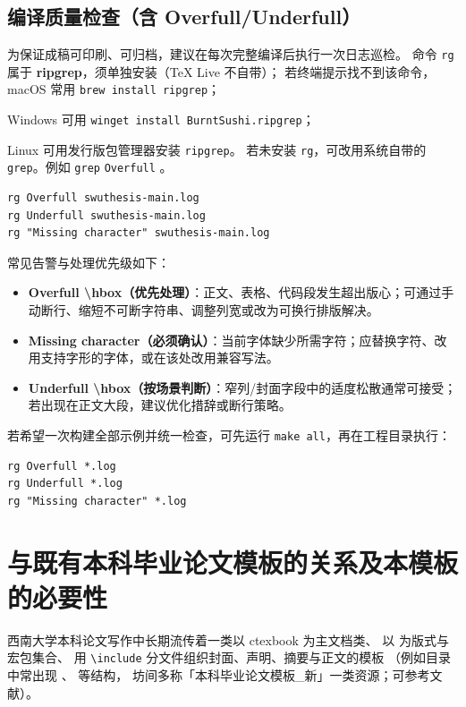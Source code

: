 \subsection{编译质量检查（含 Overfull/Underfull）}\label{sec:compile-quality-check}
为保证成稿可印刷、可归档，建议在每次完整编译后执行一次日志巡检。
命令 \texttt{rg} 属于 \textbf{ripgrep}，须单独安装（\TeX{} Live 不自带）；%
若终端提示找不到该命令，macOS 常用 \texttt{brew install ripgrep}；\par
\noindent
Windows 可用 \texttt{winget install BurntSushi.ripgrep}；\par
\noindent
Linux 可用发行版包管理器安装 \texttt{ripgrep}。%
若未安装 \texttt{rg}，可改用系统自带的 \texttt{grep}。例如%
\texttt{grep} \texttt{Overfull} 。
\begin{verbatim}
rg Overfull swuthesis-main.log
rg Underfull swuthesis-main.log
rg "Missing character" swuthesis-main.log
\end{verbatim}
常见告警与处理优先级如下：
\begin{itemize}[leftmargin=2em]
  \item \textbf{Overfull \textbackslash hbox（优先处理）}：正文、表格、代码段发生超出版心；可通过手动断行、缩短不可断字符串、调整列宽或改为可换行排版解决。
  \item \textbf{Missing character（必须确认）}：当前字体缺少所需字符；应替换字符、改用支持字形的字体，或在该处改用兼容写法。
  \item \textbf{Underfull \textbackslash hbox（按场景判断）}：窄列/封面字段中的适度松散通常可接受；若出现在正文大段，建议优化措辞或断行策略。
\end{itemize}
若希望一次构建全部示例并统一检查，可先运行 \texttt{make all}，再在工程目录执行：
\begin{verbatim}
rg Overfull *.log
rg Underfull *.log
rg "Missing character" *.log
\end{verbatim}

\section{与既有本科毕业论文模板的关系及本模板的必要性}
西南大学本科论文写作中长期流传着一类以 \textsf{ctexbook} 为主文档类、%
以  为版式与宏包集合、%
用 \texttt{\textbackslash include} 分文件组织封面、声明、摘要与正文的模板%
（例如目录中常出现 、 等结构，%
坊间多称「本科毕业论文模板\_新」一类资源；可参考文献\cite{bao2024swuthesisLegacy}）。

